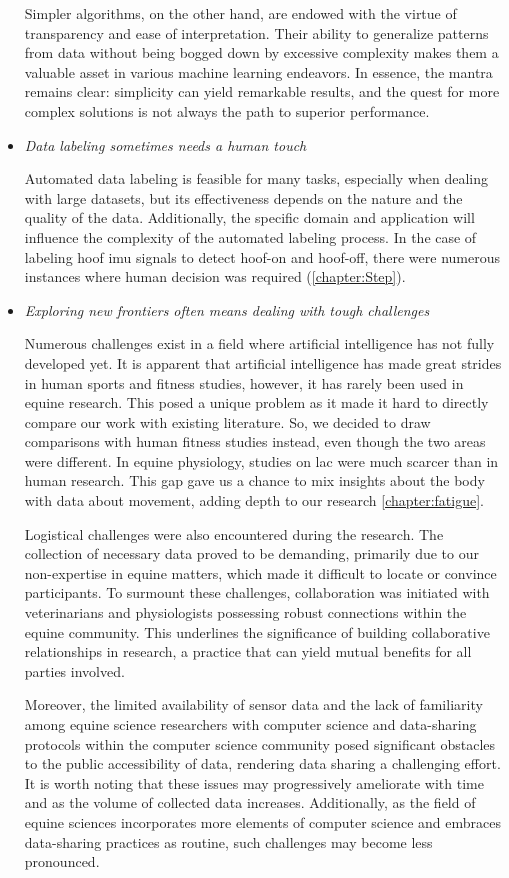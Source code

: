 \begin{itemize}[label={$\bullet$}, leftmargin=*]
Simpler algorithms, on the other hand, are endowed with the virtue of transparency and ease of interpretation. Their ability to generalize patterns from data without being bogged down by excessive complexity makes them a valuable asset in various machine learning endeavors. In essence, the mantra remains clear: simplicity can yield remarkable results, and the quest for more complex solutions is not always the path to superior performance.

\item{\textit{Data labeling sometimes needs a human touch}} 

Automated data labeling is feasible for many tasks, especially when dealing with large datasets, but its effectiveness depends on the nature and the quality of the data. Additionally, the specific domain and application will influence the complexity of the automated labeling process. In the case of labeling hoof \gls{imu} signals to detect hoof-on and hoof-off, there were numerous instances where human decision was required (\ref{chapter:Step}).

\item{\textit{Exploring new frontiers often means dealing with tough challenges}} 

Numerous challenges exist in a field where artificial intelligence has not fully developed yet. It is apparent that artificial intelligence has made great strides in human sports and fitness studies, however, it has rarely been used in equine research. This posed a unique problem as it made it hard to directly compare our work with existing literature. So, we decided to draw comparisons with human fitness studies instead, even though the two areas were different. In equine physiology, studies on \gls{lac} were much scarcer than in human research. This gap gave us a chance to mix insights about the body with data about movement, adding depth to our research \ref{chapter:fatigue}. 

Logistical challenges were also encountered during the research. The collection of necessary data proved to be demanding, primarily due to our non-expertise in equine matters, which made it difficult to locate or convince participants. To surmount these challenges, collaboration was initiated with veterinarians and physiologists possessing robust connections within the equine community. This underlines the significance of building collaborative relationships in research, a practice that can yield mutual benefits for all parties involved.

Moreover, the limited availability of sensor data and the lack of familiarity among equine science researchers with computer science and data-sharing protocols within the computer science community posed significant obstacles to the public accessibility of data, rendering data sharing a challenging effort. It is worth noting that these issues may progressively ameliorate with time and as the volume of collected data increases. Additionally, as the field of equine sciences incorporates more elements of computer science and embraces data-sharing practices as routine, such challenges may become less pronounced.


\end{itemize}
